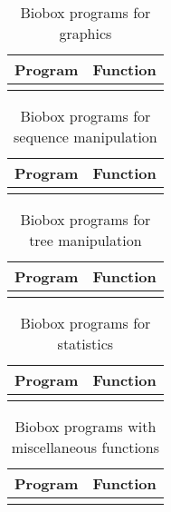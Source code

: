 \begin{table}
  \caption{Biobox programs for graphics}\label{tab:gra}
  \begin{center}
    \begin{tabular}{ll}
      \hline
      Program & Function\\\hline
      \\
      \hline
    \end{tabular}
  \end{center}
\end{table}

\begin{table}
  \caption{Biobox programs for sequence manipulation}\label{tab:seqMan}
  \begin{center}
    \begin{tabular}{ll}
      \hline
      Program & Function\\\hline
    \\
      \hline
    \end{tabular}
  \end{center}
\end{table}

\begin{table}
  \caption{Biobox programs for tree manipulation}\label{tab:tre}
  \begin{center}
    \begin{tabular}{ll}
      \hline
    Program & Function\\\hline
      \\
      \hline
    \end{tabular}
  \end{center}
\end{table}

\begin{table}
  \caption{Biobox programs for statistics}\label{tab:sta}
  \begin{center}
    \begin{tabular}{ll}
      \hline
      Program & Function\\\hline
      \\
      \hline
    \end{tabular}
  \end{center}
\end{table}

\begin{table}
  \caption{Biobox programs with miscellaneous functions}\label{tab:mis}
  \begin{center}
    \begin{tabular}{ll}
      \hline
      Program & Function\\\hline
      \\
      \hline
    \end{tabular}
  \end{center}
\end{table}
